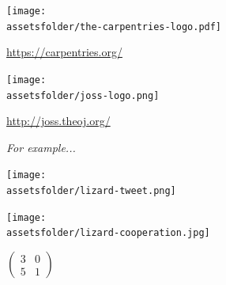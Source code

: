\documentclass{beamer}
\newcommand{\assetsfolder}{./assets}
\begin{document}
	\begin{frame}
	   \begin{center}
		   \texttt{[image: \\assetsfolder/the-carpentries-logo.pdf]}

			\url{https://carpentries.org/}
	   \end{center}
	\end{frame}

	\begin{frame}
	   \begin{center}
           \texttt{[image: \\assetsfolder/joss-logo.png]}

			\url{http://joss.theoj.org/}
	   \end{center}
	\end{frame}

	\begin{frame}
		\Huge
		\begin{center}
			\textit {For example...}
		\end{center}
	\end{frame}

	\begin{frame}
		\begin{center}
			\texttt{[image: \\assetsfolder/lizard-tweet.png]}
		\end{center}
		\begin{center}
			\pause
			\texttt{[image: \\assetsfolder/lizard-cooperation.jpg]}
		\end{center}

	\end{frame}

	\begin{frame}
		\fontsize{74}{65}\selectfont
		\begin{center}
			\(
				\begin{pmatrix}
					3 & 0\\
					5 & 1
				\end{pmatrix}
			\)
		\end{center}
	\end{frame}
\end{document}
